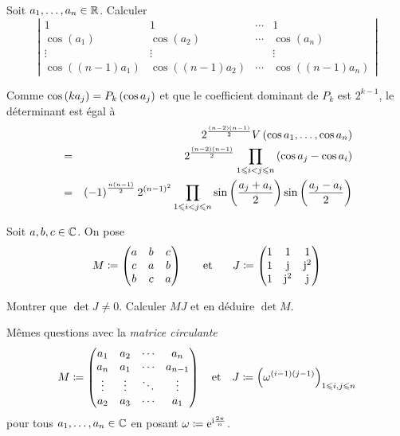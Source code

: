 \documentclass{magnolia}
\begin{document}
Soit $a_1,\ldots,a_n\in\mathbb{R}$. Calculer
\[\left|
  \begin{array}{cccc}
  1        & 1 & \cdots & 1\\
  \cos(a_1) & \cos(a_2) & \cdots & \cos(a_n)\\
  \vdots   &   \vdots   &         & \vdots\\
  \cos ((n-1)a_1) & \cos((n-1)a_2) & \cdots & \cos((n-1)a_n)
  \end{array}
  \right|\]
\begin{sol}
Comme $\cos\left(k a_j\right)=P_k\left(\cos a_j\right)$ et que le coefficient dominant
de $P_k$ est $2^{k-1}$, le déterminant est égal à 
\begin{eqnarray*}
& & 2^{\frac{\left(n-2\right)\left(n-1\right)}{2}}V\left(\cos a_1,\ldots,\cos a_n\right)\\
&=& 2^{\frac{\left(n-2\right)\left(n-1\right)}{2}}\prod_{1\leqslant i<j\leqslant n} \left(\cos a_j-\cos a_i\right)\\
&=& \left(-1\right)^{\frac{n\left(n-1\right)}{2}}2^{\left(n-1\right)^2}\prod_{1\leqslant i<j\leqslant n}
    \sin\left(\frac{a_j+a_i}{2}\right)\sin\left(\frac{a_j-a_i}{2}\right)
\end{eqnarray*}
\end{sol}

\begin{questions}
\question Soit $a,b,c\in\mathbb{C}$. On pose
  \[M\coloneqq\begin{pmatrix}
    a&b&c\\
    c&a&b\\
    b&c&a
  \end{pmatrix} \quad\quad\!\text{et}\quad\!\quad J\coloneqq\begin{pmatrix}
  1 & 1 & 1\\
  1 & {\rm j} & {\rm j}^2\\
  1 & {\rm j}^2 & {\rm j}
  \end{pmatrix}\]
  \begin{questions}
  \question Montrer que $\det J\neq 0$.
  \question Calculer $MJ$ et en déduire $\det M$.
  \end{questions}
\question Mêmes questions avec la \emph{matrice circulante}
  \[M\coloneqq\begin{pmatrix}
    a_1 & a_2 & \cdots & a_n\\
    a_n & a_1 & \cdots & a_{n-1}\\
    \vdots & \vdots & \ddots & \vdots\\
    a_2 & a_3 & \cdots & a_1
  \end{pmatrix} \quad\text{et}\quad 
  J\coloneqq \left(\omega^{(i-1)(j-1)}\right)_{1\leqslant i,j\leqslant n}\]
  pour tous $a_1,\ldots,a_n\in\mathbb{C}$ en posant $\omega\coloneqq {\rm e}^{{\rm i}\frac{2\pi}{n}}$.
\end{questions}
\end{document}
